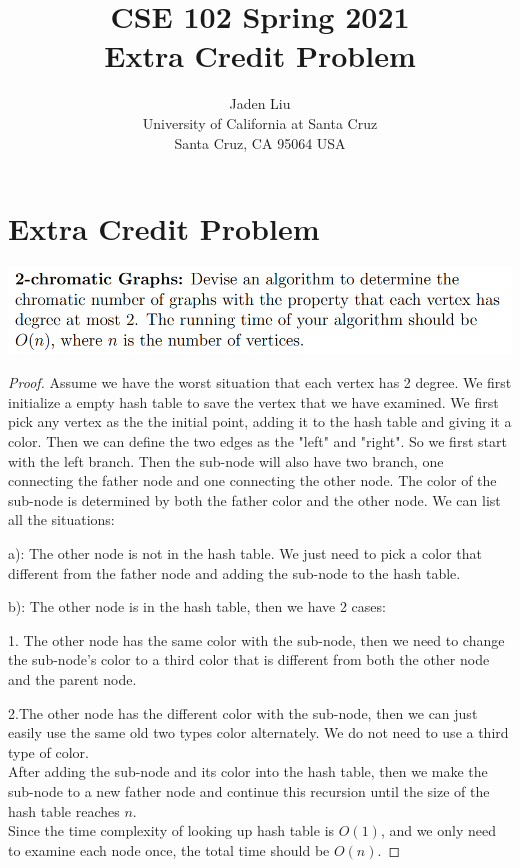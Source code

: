 \documentclass[12pt]{article}
\begin{document}
\title{ CSE 102 Spring 2021\\
	Extra Credit Problem}

\author{Jaden Liu \\ 
University of California at Santa Cruz\\
Santa Cruz, CA 95064 USA }

\maketitle


\section{Extra Credit Problem} 
\includegraphics[scale=0.4]{1.png}
\begin{proof}
	Assume we have the worst situation that each vertex has 2 degree. We first initialize a empty hash table to save the vertex that we have examined. We first pick any vertex as the the initial point, adding it to the hash table and giving it a color. Then we can define the two edges as the "left" and "right". So we first start with the left branch. Then the sub-node will also have two branch, one connecting the father node and one connecting the other node. The color of the sub-node is determined by both the father color and the other node. We can list all the situations:
	
	a): The other node is not in the hash table. We just need to pick a color that different from the father node and adding the sub-node to the hash table.
	
	b): The other node is in the hash table, then we have 2 cases:
	
	1. The other node has the same color with the sub-node, then we need to change the sub-node's color to a third color that is different from both the other node and the parent node.
	
	2.The other node has the different color with the sub-node, then we can just easily use the same old two types color alternately. We do not need to use a third type of color.\\
	After adding the sub-node and its color into the hash table, then we make the sub-node to a new father node and continue this recursion until the size of the hash table reaches $n$.\\
	Since the time complexity of looking up hash table is $O(1)$, and we only need to examine each node once, the total time should be $O(n)$.
\end{proof}
\end{document}

